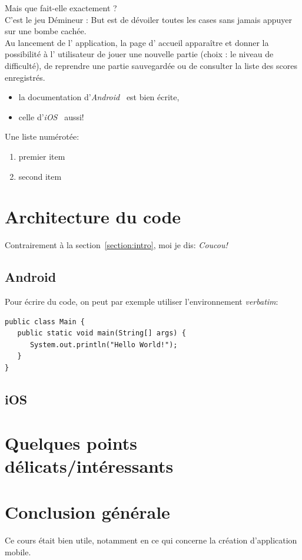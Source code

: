 \documentclass{article}
\begin{document}
Mais que fait-elle exactement ? \\
	C'est le jeu Démineur :  But est de dévoiler toutes les cases sans jamais appuyer sur une bombe cachée.\\
	Au lancement de l’ application, la page d’ accueil apparaître et donner la
possibilité à l' utilisateur de jouer une nouvelle partie (choix : le niveau de difficulté), de reprendre une partie sauvegardée ou de consulter la liste des scores enregistrés.



\begin{itemize}
\item la documentation d'\textit{Android}~\cite{androidDoc}
  est bien écrite,
\item celle d'\textit{iOS}~\cite{iosDoc} aussi!
\end{itemize}

Une liste numérotée:
\begin{enumerate}
\item premier item
\item second item
\end{enumerate}



\section{Architecture du code}
Contrairement à la section~\ref{section:intro},
moi je dis: \textit{Coucou!}

\subsection{Android} %
Pour écrire du code, on peut par exemple utiliser l'environnement
\textit{verbatim}:
\begin{verbatim}
public class Main {
   public static void main(String[] args) {
      System.out.println("Hello World!");
   }
}
\end{verbatim}

\subsection{iOS} %


\section{Quelques points délicats/intéressants}


\section{Conclusion générale}
	Ce cours était bien utile, notamment en ce qui concerne la création d'application mobile.




\end{document}
